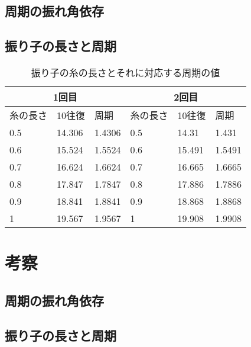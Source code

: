 \documentclass{jlreq}
\begin{document}
  \subsection{周期の振れ角依存}
  \subsection{振り子の長さと周期}
  \begin{table}[]
    \centering
    \caption{振り子の糸の長さとそれに対応する周期の値}
    \label{tab:my-table}
    \begin{tabular}{|lll|lll|}
    \hline
    \multicolumn{3}{|c|}{1回目} & \multicolumn{3}{c|}{2回目} \\ \hline
    \multicolumn{1}{|l|}{糸の長さ} & \multicolumn{1}{l|}{10往復} & 周期 & \multicolumn{1}{l|}{糸の長さ} & \multicolumn{1}{l|}{10往復} & 周期 \\ \hline
    \multicolumn{1}{|l|}{0.5} & \multicolumn{1}{l|}{14.306} & 1.4306 & \multicolumn{1}{l|}{0.5} & \multicolumn{1}{l|}{14.31} & 1.431 \\ \hline
    \multicolumn{1}{|l|}{0.6} & \multicolumn{1}{l|}{15.524} & 1.5524 & \multicolumn{1}{l|}{0.6} & \multicolumn{1}{l|}{15.491} & 1.5491 \\ \hline
    \multicolumn{1}{|l|}{0.7} & \multicolumn{1}{l|}{16.624} & 1.6624 & \multicolumn{1}{l|}{0.7} & \multicolumn{1}{l|}{16.665} & 1.6665 \\ \hline
    \multicolumn{1}{|l|}{0.8} & \multicolumn{1}{l|}{17.847} & 1.7847 & \multicolumn{1}{l|}{0.8} & \multicolumn{1}{l|}{17.886} & 1.7886 \\ \hline
    \multicolumn{1}{|l|}{0.9} & \multicolumn{1}{l|}{18.841} & 1.8841 & \multicolumn{1}{l|}{0.9} & \multicolumn{1}{l|}{18.868} & 1.8868 \\ \hline
    \multicolumn{1}{|l|}{1} & \multicolumn{1}{l|}{19.567} & 1.9567 & \multicolumn{1}{l|}{1} & \multicolumn{1}{l|}{19.908} & 1.9908 \\ \hline
    \end{tabular}
    \end{table}
  \section{考察}
  \subsection{周期の振れ角依存}
  \subsection{振り子の長さと周期}
\end{document}
